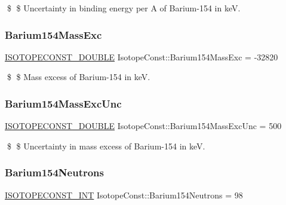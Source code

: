 \$ \$ Uncertainty in binding energy per A of Barium-\/154 in keV. \mbox{\label{group___isotope_const-_barium-_ba154_gab4167d862b95ea282dd817561a0d3355}} 
\subsubsection{\texorpdfstring{Barium154\+Mass\+Exc}{Barium154MassExc}}
{\footnotesize\ttfamily \mbox{\hyperlink{group___isotope_const-_macros_ga8f45a7272ce02c0b4c65c44636ed719a}{I\+S\+O\+T\+O\+P\+E\+C\+O\+N\+S\+T\+\_\+\+D\+O\+U\+B\+LE}} Isotope\+Const\+::\+Barium154\+Mass\+Exc = -\/32820}

\$ \$ Mass excess of Barium-\/154 in keV. \mbox{\label{group___isotope_const-_barium-_ba154_gac5088a0bf2b08c27303252908a873cdf}} 
\subsubsection{\texorpdfstring{Barium154\+Mass\+Exc\+Unc}{Barium154MassExcUnc}}
{\footnotesize\ttfamily \mbox{\hyperlink{group___isotope_const-_macros_ga8f45a7272ce02c0b4c65c44636ed719a}{I\+S\+O\+T\+O\+P\+E\+C\+O\+N\+S\+T\+\_\+\+D\+O\+U\+B\+LE}} Isotope\+Const\+::\+Barium154\+Mass\+Exc\+Unc = 500}

\$ \$ Uncertainty in mass excess of Barium-\/154 in keV. \mbox{\label{group___isotope_const-_barium-_ba154_ga5ed94c06f3c67444ed63ea377807ea2f}} 
\subsubsection{\texorpdfstring{Barium154\+Neutrons}{Barium154Neutrons}}
{\footnotesize\ttfamily \mbox{\hyperlink{group___isotope_const-_macros_ga5f18360b3e99483a35c32d789e62621c}{I\+S\+O\+T\+O\+P\+E\+C\+O\+N\+S\+T\+\_\+\+I\+NT}} Isotope\+Const\+::\+Barium154\+Neutrons = 98}

